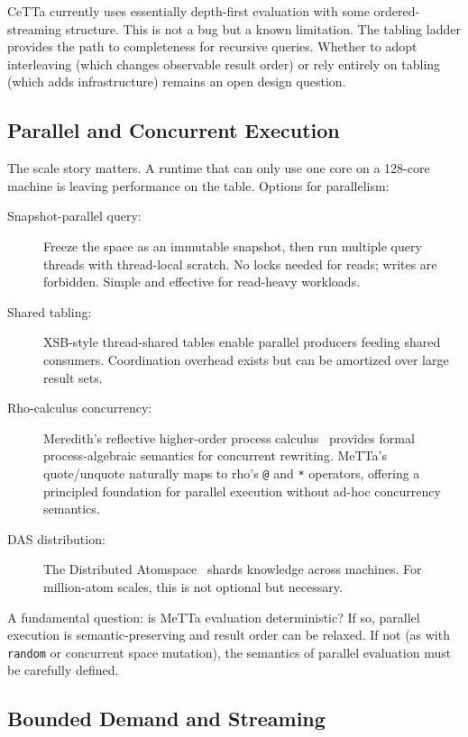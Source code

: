 \documentclass[11pt]{article}
\newcommand{\code}[1]{\texttt{#1}}
\newcommand{\CeTTa}{\textup{CeTTa}}
\newcommand{\XSB}{\textup{XSB}}
\begin{document}
\CeTTa{} currently uses essentially depth-first evaluation with some
ordered-streaming structure.  This is not a bug but a known limitation.
The tabling ladder provides the path to completeness for recursive queries.
Whether to adopt interleaving (which changes observable result order) or
rely entirely on tabling (which adds infrastructure) remains an open
design question.

\subsection{Parallel and Concurrent Execution}

The scale story matters.  A runtime that can only use one core on a 128-core
machine is leaving performance on the table.  Options for parallelism:

\begin{description}
\item[Snapshot-parallel query:] Freeze the space as an immutable snapshot,
  then run multiple query threads with thread-local scratch.  No locks
  needed for reads; writes are forbidden.  Simple and effective for
  read-heavy workloads.
\item[Shared tabling:] \XSB{}-style thread-shared tables enable parallel
  producers feeding shared consumers.  Coordination overhead exists but
  can be amortized over large result sets.
\item[Rho-calculus concurrency:] Meredith's reflective higher-order process
  calculus~\cite{Meredith2005} provides formal process-algebraic semantics
  for concurrent rewriting.  MeTTa's quote/unquote naturally maps to rho's
  \code{@} and \code{*} operators, offering a principled foundation for
  parallel execution without ad-hoc concurrency semantics.
\item[DAS distribution:] The Distributed Atomspace~\cite{DAS} shards
  knowledge across machines.  For million-atom scales, this is not
  optional but necessary.
\end{description}

A fundamental question: is MeTTa evaluation deterministic?  If so, parallel
execution is semantic-preserving and result order can be relaxed.  If not
(as with \code{random} or concurrent space mutation), the semantics of
parallel evaluation must be carefully defined.

\subsection{Bounded Demand and Streaming}
\end{document}
